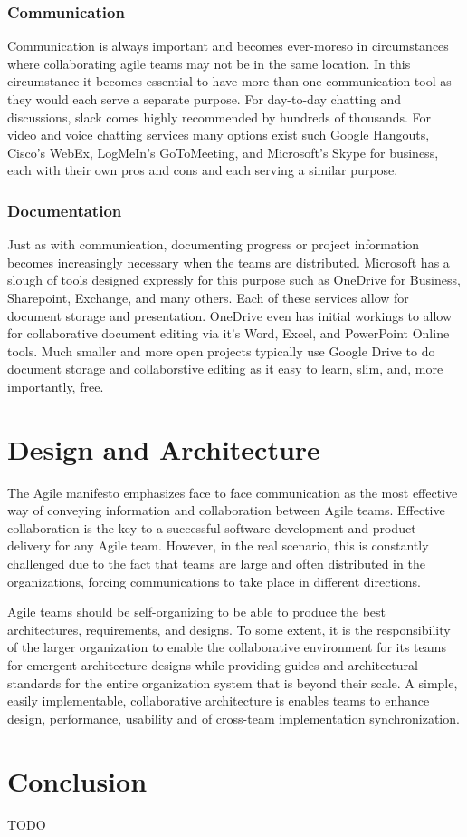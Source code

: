 \documentclass[sigplan,screen]{acmart}
\begin{document}
\subsubsection{Communication}
Communication is always important and becomes ever-moreso in circumstances where collaborating agile teams may not be in the same location. In this circumstance it becomes essential to have more than one communication tool as they would each serve a separate purpose. For day-to-day chatting and discussions, slack comes highly recommended by hundreds of thousands. For video and voice chatting services many options exist such Google Hangouts, Cisco's WebEx, LogMeIn's GoToMeeting, and Microsoft's Skype for business, each with their own pros and cons and each serving a similar purpose.

\subsubsection{Documentation}
Just as with communication, documenting progress or project information becomes increasingly necessary when the teams are distributed. Microsoft has a slough of tools designed expressly for this purpose such as OneDrive for Business, Sharepoint, Exchange, and many others. Each of these services allow for document storage and presentation. OneDrive even has initial workings to allow for collaborative document editing via it's Word, Excel, and PowerPoint Online tools. Much smaller and more open projects typically use Google Drive to do document storage and collaborstive editing as it easy to learn, slim, and, more importantly, free.

\section{Design and Architecture}
The Agile manifesto emphasizes face to face communication as the most effective way of conveying information and collaboration between Agile teams. Effective collaboration is the key to a successful software development and product delivery for any Agile team. However, in the real scenario, this is constantly challenged due to the fact that teams are large and often distributed in the organizations, forcing communications to take place in different directions.
\par
Agile teams should be self-organizing to be able to produce the best architectures, requirements, and designs. To some extent, it is the responsibility of the larger organization to enable the collaborative environment for its teams for emergent architecture designs while providing guides and architectural standards for the entire organization system that is beyond their scale. A simple, easily implementable, collaborative architecture is enables teams to enhance design, performance, usability and of cross-team implementation synchronization.

\section{Conclusion}
TODO



\end{document}
